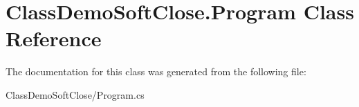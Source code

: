 \hypertarget{class_class_demo_soft_close_1_1_program}{}\section{Class\+Demo\+Soft\+Close.\+Program Class Reference}
\label{class_class_demo_soft_close_1_1_program}


The documentation for this class was generated from the following file\+:\begin{DoxyCompactItemize}
\item 
Class\+Demo\+Soft\+Close/Program.\+cs\end{DoxyCompactItemize}
